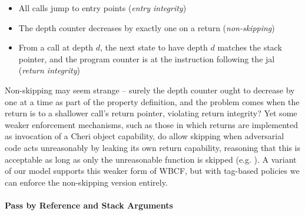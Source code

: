 \documentclass[acmsmall,review,anonymous]{acmart}\settopmatter{printfolios=true,printccs=false,printacmref=false}
\begin{document}
\begin{itemize}
\item All calls jump to entry points ({\em entry integrity})
\item The depth counter decreases by exactly one on a return ({\em non-skipping})
\item From a call at depth \(d\), the next state to have depth \(d\) matches the stack pointer,
  and the program counter is at the instruction following the jal ({\em return integrity})
\end{itemize}

Non-skipping may seem strange -- surely the depth counter ought to decrease by one at a time
as part of the property definition, and the problem comes when the return is to a shallower
call's return pointer, violating return integrity? Yet some weaker enforcement mechanisms,
such as those in which returns are implemented as invocation of a Cheri object capability,
do allow skipping when adversarial code acts unreasonably by leaking its own return capability,
reasoning that this is acceptable as long as only the unreasonable function is skipped
(e.g. \citep{Skorstengaard+19b}). A variant of our model supports this weaker form of WBCF,
but with tag-based policies we can enforce the non-skipping version entirely.

\paragraph*{Pass by Reference and Stack Arguments}

\newcommand{\mainpassc}{magenta}
\newcommand{\sharec}{lgray}
\end{document}

